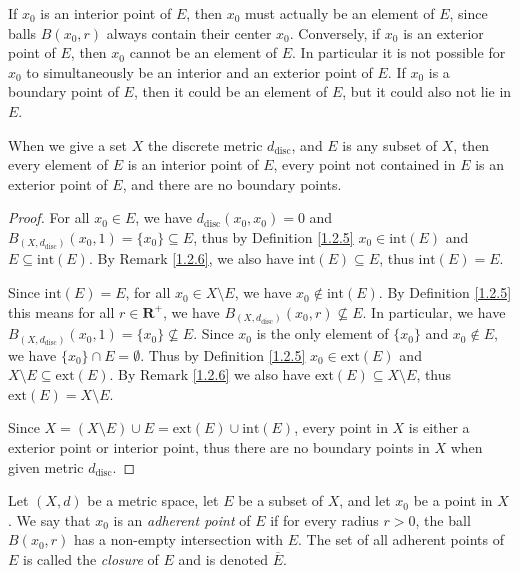 \begin{remark}\label{1.2.6}
    If \(x_0\) is an interior point of \(E\), then \(x_0\) must actually be an element of \(E\), since balls \(B(x_0, r)\) always contain their center \(x_0\).
    Conversely, if \(x_0\) is an exterior point of \(E\), then \(x_0\) cannot be an element of \(E\).
    In particular it is not possible for \(x_0\) to simultaneously be an interior and an exterior point of \(E\).
    If \(x_0\) is a boundary point of \(E\), then it could be an element of \(E\), but it could also not lie in \(E\).
\end{remark}

\setcounter{theorem}{7}
\begin{example}\label{1.2.8}
    When we give a set \(X\) the discrete metric \(d_{\text{disc}}\), and \(E\) is any subset of \(X\), then every element of \(E\) is an interior point of \(E\), every point not contained in \(E\) is an exterior point of \(E\), and there are no boundary points.
\end{example}

\begin{proof}
    For all \(x_0 \in E\), we have \(d_{\text{disc}}(x_0, x_0) = 0\) and \(B_{(X, d_{\text{disc}})}(x_0, 1) = \{x_0\} \subseteq E\), thus by Definition \ref{1.2.5} \(x_0 \in \text{int}(E)\) and \(E \subseteq \text{int}(E)\).
    By Remark \ref{1.2.6}, we also have \(\text{int}(E) \subseteq E\), thus \(\text{int}(E) = E\).

    Since \(\text{int}(E) = E\), for all \(x_0 \in X \setminus E\), we have \(x_0 \notin \text{int}(E)\).
    By Definition \ref{1.2.5} this means for all \(r \in \mathbf{R}^+\), we have \(B_{(X, d_{\text{disc}})}(x_0, r) \not\subseteq E\).
    In particular, we have \(B_{(X, d_{\text{disc}})}(x_0, 1) = \{x_0\} \not\subseteq E\).
    Since \(x_0\) is the only element of \(\{x_0\}\) and \(x_0 \notin E\), we have \(\{x_0\} \cap E = \emptyset\).
    Thus by Definition \ref{1.2.5} \(x_0 \in \text{ext}(E)\) and \(X \setminus E \subseteq \text{ext}(E)\).
    By Remark \ref{1.2.6} we also have \(\text{ext}(E) \subseteq X \setminus E\), thus \(\text{ext}(E) = X \setminus E\).

    Since \(X = (X \setminus E) \cup E = \text{ext}(E) \cup \text{int}(E)\), every point in \(X\) is either a exterior point or interior point, thus there are no boundary points in \(X\) when given metric \(d_{\text{disc}}\).
\end{proof}

\begin{definition}[Closure]\label{1.2.9}
    Let \((X, d)\) be a metric space, let \(E\) be a subset of \(X\), and let \(x_0\) be a point in \(X\).
    We say that \(x_0\) is an \emph{adherent point} of \(E\) if for every radius \(r > 0\), the ball \(B(x_0, r)\) has a non-empty intersection with \(E\).
    The set of all adherent points of \(E\) is called the \emph{closure} of \(E\) and is denoted \(\overline{E}\).
\end{definition}

